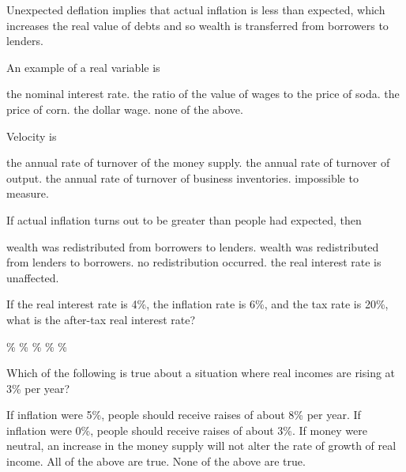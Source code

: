 \documentclass[addpoints,11pt]{exam}
\theoremstyle{definition}
\begin{document}
\begin{questions}
	\begin{solution}
		Unexpected deflation implies that actual inflation is less than expected, which increases the real value of debts and so wealth is transferred from borrowers to lenders.
	\end{solution}
	
\question An example of a real variable is

\begin{choices}
	\choice the nominal interest rate.
	\CorrectChoice the ratio of the value of wages to the price of soda.
	\choice the price of corn.
	\choice the dollar wage.
	\choice none of the above.
\end{choices}


\question Velocity is 

\begin{choices}
	\CorrectChoice the annual rate of turnover of the money supply.
	\choice the annual rate of turnover of output.
	\choice the annual rate of turnover of business inventories.
	\choice impossible to measure.
\end{choices}


\question If actual inflation turns out to be greater than people had expected, then

\begin{choices}
	\choice wealth was redistributed from borrowers to lenders.
	\CorrectChoice wealth was redistributed from lenders to borrowers.
	\choice no redistribution occurred.
	\choice the real interest rate is unaffected.
\end{choices}

\question If the real interest rate is 4\%, the inflation rate is 6\%, and the tax rate is 20\%, what is the after-tax real interest rate?

\begin{choices}
	\%
	\%
	\%
	\%
	\%
\end{choices}

\question Which of the following is true about a situation where real incomes are rising at 3\% per year?

\begin{choices}
	\choice If inflation were 5\%, people should receive raises of about 8\% per year.
	\choice If inflation were 0\%, people should receive raises of about 3\%.
	\choice If money were neutral, an increase in the money supply will not alter the rate of growth of real income.
	\CorrectChoice All of the above are true.
	\choice None of the above are true.
\end{choices}
	

\end{questions}
\end{document}
